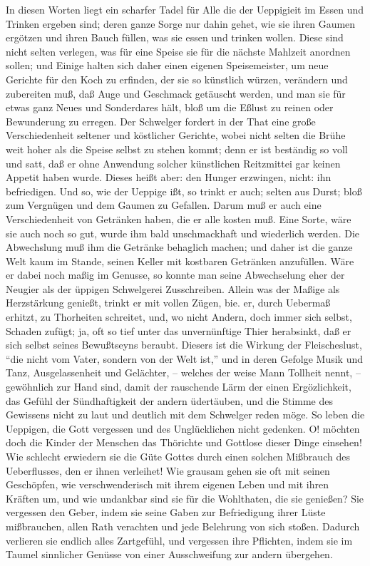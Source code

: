 In diesen Worten liegt ein scharfer Tadel für Alle die der Ueppigieit im Essen
und Trinken ergeben sind; deren ganze Sorge nur dahin gehet, wie sie ihren
Gaumen ergötzen und ihren Bauch füllen, was sie essen und trinken wollen. Diese
sind nicht selten verlegen, was für eine Speise sie für die nächste Mahlzeit
anordnen sollen; und Einige halten sich daher einen eigenen Speisemeister, um
neue Gerichte für den Koch zu erfinden, der sie so künstlich würzen, verändern
und zubereiten muß, daß Auge und Geschmack getäuscht werden, und man sie für
etwas ganz Neues und Sonderdares hält, bloß um die Eßlust zu reinen oder
Bewunderung zu erregen. Der Schwelger fordert in der That eine große
Verschiedenheit seltener und köstlicher Gerichte, wobei nicht selten die Brühe
weit hoher als die Speise selbst zu stehen kommt; denn er ist beständig so voll
und satt, daß er ohne Anwendung solcher künstlichen Reitzmittei gar keinen
Appetit haben wurde. Dieses heißt aber: den Hunger erzwingen, nicht: ihn
befriedigen. Und so, wie der Ueppige ißt, so trinkt er auch; selten aus Durst;
bloß zum Vergnügen und dem Gaumen zu Gefallen. Darum muß er auch eine
Verschiedenheit von Getränken haben, die er alle kosten muß. Eine Sorte, wäre
sie auch noch so gut, wurde ihm bald unschmackhaft und wiederlich werden. Die
Abwechslung muß ihm die Getränke behaglich machen; und daher ist die ganze Welt
kaum im Stande, seinen Keller mit kostbaren Getränken anzufüllen. Wäre er dabei
noch maßig im Genusse, so konnte man seine Abwechselung eher der Neugier als der
üppigen Schwelgerei Zusschreiben. Allein was der Maßige als Herzstärkung
genießt, trinkt er mit vollen Zügen, bie. er, durch Uebermaß erhitzt, zu
Thorheiten schreitet, und, wo nicht Andern, doch immer sich selbst, Schaden
zufügt; ja, oft so tief unter das unvernünftige Thier herabsinkt, daß er sich
selbst seines Bewußtseyns beraubt. Diesers ist die Wirkung der Fleischeslust,
"`die nicht vom Vater, sondern von der Welt ist,"' und in deren Gefolge Musik
und Tanz, Ausgelassenheit und Gelächter, -- welches der weise Mann Tollheit
nennt, -- gewöhnlich zur Hand sind, damit der rauschende Lärm der einen
Ergözlichkeit, das Gefühl der Sündhaftigkeit der andern üdertäuben, und die
Stimme des Gewissens nicht zu laut und deutlich mit dem Schwelger reden möge. So
leben die Ueppigen, die Gott vergessen und des Unglücklichen nicht gedenken. O!
möchten doch die Kinder der Menschen das Thörichte und Gottlose dieser Dinge
einsehen! Wie schlecht erwiedern sie die Güte Gottes durch einen solchen
Mißbrauch des Ueberflusses, den er ihnen verleihet! Wie grausam gehen sie oft
mit seinen Geschöpfen, wie verschwenderisch mit ihrem eigenen Leben und mit
ihren Kräften um, und wie undankbar sind sie für die Wohlthaten, die sie
genießen? Sie vergessen den Geber, indem sie seine Gaben zur Befriedigung ihrer
Lüste mißbrauchen, allen Rath verachten und jede Belehrung von sich stoßen.
Dadurch verlieren sie endlich alles Zartgefühl, und vergessen ihre Pflichten,
indem sie im Taumel sinnlicher Genüsse von einer Ausschweifung zur andern
übergehen.

